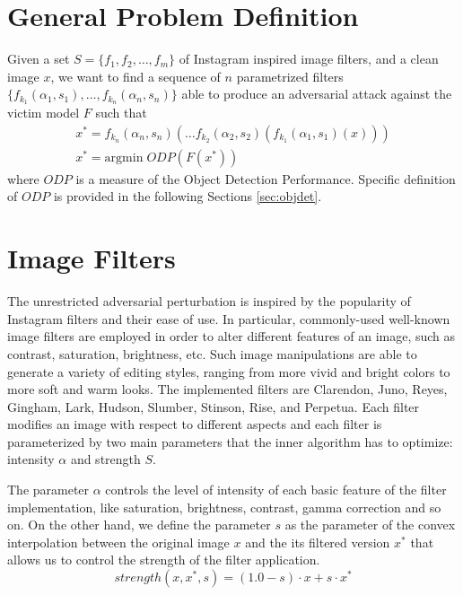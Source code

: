\section{General Problem Definition}
Given a set $S = \{ f_1, f_2, \dots, f_m \}$ of Instagram inspired image filters, and a clean image $x$, we want to find a sequence of $n$ parametrized filters $\{f_{k_1}(\alpha_1,s_1),\ldots,f_{k_n}(\alpha_n,s_n)\}$ able to produce an adversarial attack against the victim model $F$ such that 
 \begin{equation}      
 \begin{array}{cc}
      x^* = f_{k_n}(\alpha_n,s_n)(\dots f_{k_2}(\alpha_2,s_2)(f_{k_1}(\alpha_1,s_1)(x)))\\
      x^* = \mathrm{argmin} \; ODP(F(x^*))
      
 \end{array}
    \label{eq:filter_application}
 \end{equation}
 where $ODP$ is a measure of the Object Detection
Performance.
Specific definition of $ODP$ is provided in the following Sections \ref{sec:objdet}.
 

\section{Image Filters}

The unrestricted adversarial perturbation is inspired by the popularity of Instagram filters and their ease of use. In particular, commonly-used well-known image filters are employed in order to alter  different features of an image, such as contrast, saturation, brightness, etc. Such image manipulations are able to generate a variety of editing styles, ranging from more vivid and bright colors to more soft and warm looks. The implemented filters are Clarendon, Juno, Reyes, Gingham, Lark, Hudson, Slumber, Stinson,
Rise, and Perpetua.
Each filter modifies an image with respect to different aspects and each filter is parameterized by two main parameters that the inner algorithm has to optimize: intensity $\alpha$ and strength $S$.

The parameter $\alpha$ controls the level of intensity of each basic feature of the filter implementation, like saturation, brightness, contrast, gamma correction and so on. On the other hand, we define the parameter $s$ as the parameter of the convex interpolation between the original image $x$ and the its filtered version $x^*$ that allows us to control the strength of the filter application.
\begin{equation}
strength(x,x^*,s) = (1.0-s) \cdot x + s \cdot x^*
\end{equation}

